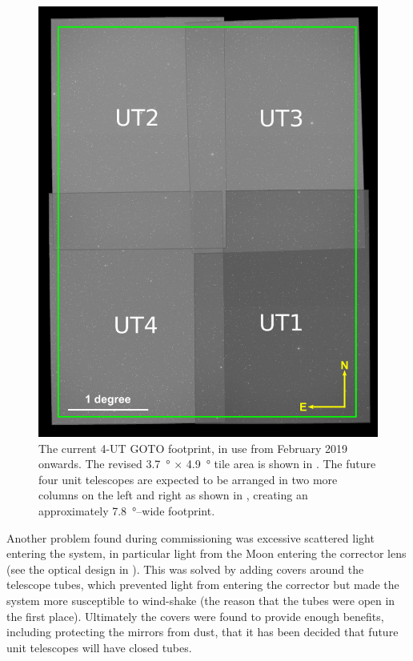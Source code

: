 \begin{colsection}
\begin{figure}[p]
    \begin{center}
        \includegraphics[width=0.55\linewidth]{images/footprint_2_box.png}
    \end{center}
    \caption[The current 4-UT GOTO footprint]{
        The current 4-UT GOTO footprint, in use from February 2019 onwards.
        The revised \SI{3.7}{\degree} $\times$ \SI{4.9}{\degree} tile area is shown in . The future four unit telescopes are expected to be arranged in two more columns on the left and right as shown in , creating an approximately \SI{7.8}{\degree}--wide footprint.
    }\label{fig:4ut_footprint}
\end{figure}

\newpage

Another problem found during commissioning was excessive scattered light entering the system, in particular light from the Moon entering the corrector lens (see the optical design in ). This was solved by adding covers around the telescope tubes, which prevented light from entering the corrector but made the system more susceptible to wind-shake (the reason that the tubes were open in the first place). Ultimately the covers were found to provide enough benefits, including protecting the mirrors from dust, that it has been decided that future unit telescopes will have closed tubes.


\end{colsection}

